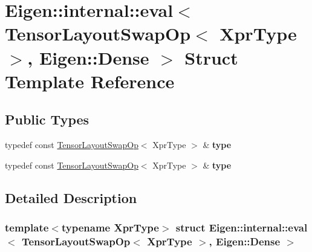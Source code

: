 \hypertarget{struct_eigen_1_1internal_1_1eval_3_01_tensor_layout_swap_op_3_01_xpr_type_01_4_00_01_eigen_1_1_dense_01_4}{}\section{Eigen\+:\+:internal\+:\+:eval$<$ Tensor\+Layout\+Swap\+Op$<$ Xpr\+Type $>$, Eigen\+:\+:Dense $>$ Struct Template Reference}
\label{struct_eigen_1_1internal_1_1eval_3_01_tensor_layout_swap_op_3_01_xpr_type_01_4_00_01_eigen_1_1_dense_01_4}
\subsection*{Public Types}
\begin{DoxyCompactItemize}
\item 
\mbox{\label{struct_eigen_1_1internal_1_1eval_3_01_tensor_layout_swap_op_3_01_xpr_type_01_4_00_01_eigen_1_1_dense_01_4_acc7125290d092f9b85ac37dde71218b4}} 
typedef const \hyperlink{class_eigen_1_1_tensor_layout_swap_op}{Tensor\+Layout\+Swap\+Op}$<$ Xpr\+Type $>$ \& {\bfseries type}
\item 
\mbox{\label{struct_eigen_1_1internal_1_1eval_3_01_tensor_layout_swap_op_3_01_xpr_type_01_4_00_01_eigen_1_1_dense_01_4_acc7125290d092f9b85ac37dde71218b4}} 
typedef const \hyperlink{class_eigen_1_1_tensor_layout_swap_op}{Tensor\+Layout\+Swap\+Op}$<$ Xpr\+Type $>$ \& {\bfseries type}
\end{DoxyCompactItemize}


\subsection{Detailed Description}
\subsubsection*{template$<$typename Xpr\+Type$>$\newline
struct Eigen\+::internal\+::eval$<$ Tensor\+Layout\+Swap\+Op$<$ Xpr\+Type $>$, Eigen\+::\+Dense $>$}



